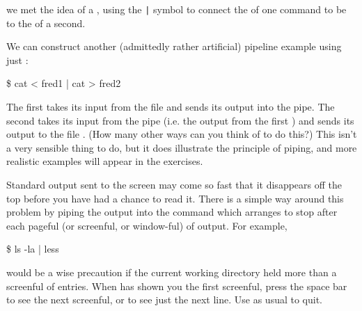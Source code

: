 

 we met the idea of a , using the \verb+|+ symbol to connect the  of one command  to be  to the
 of a second.

We can construct another (admittedly rather artificial) pipeline example using
just :

\begin{ttoutenv}
\$  cat < fred1 | cat > fred2
\end{ttoutenv}

The first  takes its input from the file
 and sends its output into the pipe. The second
 takes its input from the pipe (i.e. the output from the
first ) and sends its output to the file . (How many
other ways can you think of to do this?)  This isn't a very sensible
thing to do, but it does illustrate the principle of piping, and more realistic examples
will appear in the exercises.

Standard output sent to the screen may come so fast that it
disappears off the top before you have had a chance to read it.
There is a simple way around this problem by piping the output into the command  which arranges to stop after each pageful (or screenful, or window-ful) of output. For example,
\begin{ttoutenv}
\$ ls -la | less
\end{ttoutenv}
  would be a wise precaution if the current working directory held
  more than a screenful of entries. When  has shown you the
  first screenful, press the space bar to see the next screenful,
  or  to see just the next line. Use  as usual to quit.


